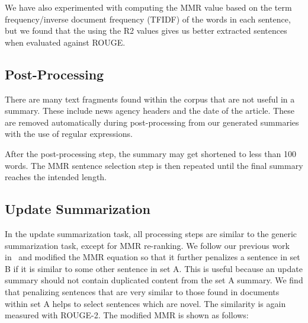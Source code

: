 We have also experimented with computing the MMR value based on the term frequency/inverse document frequency (TFIDF) of the words in each sentence, but we found that the using the R2 values gives us better extracted sentences when evaluated against ROUGE. 

\subsection{Post-Processing}

There are many text fragments found within the corpus that are not useful in a summary. These include news agency headers and the date of the article. These are removed automatically during post-processing from our generated summaries with the use of regular expressions.


After the post-processing step, the summary may get shortened to less than 100 words. The MMR sentence selection step is then repeated until the final summary reaches the intended length.

\subsection{Update Summarization}

In the update summarization task, all processing steps are similar to the generic summarization task, except for MMR re-ranking. We follow our previous work in~\cite{Lin-et-al-07} and modified the MMR equation so that it further penalizes a sentence in set B if it is similar to some other sentence in set A. This is useful because an update summary should not contain duplicated content from the set A  summary. We find that penalizing sentences that are very similar to those found in documents within set A helps to select sentences which are novel. The similarity is again measured with ROUGE-2. The modified MMR is shown as follows:

